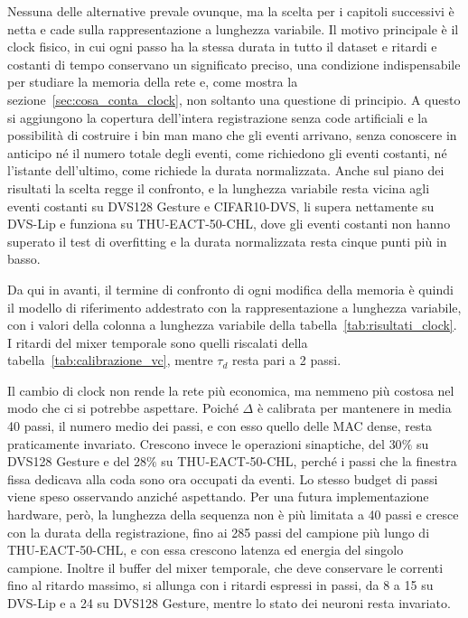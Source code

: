 Nessuna delle alternative prevale ovunque, ma la scelta per i capitoli successivi è netta e cade sulla rappresentazione a lunghezza variabile. Il motivo principale è il clock fisico, in cui ogni passo ha la stessa durata in tutto il dataset e ritardi e costanti di tempo conservano un significato preciso, una condizione indispensabile per studiare la memoria della rete e, come mostra la sezione~\ref{sec:cosa_conta_clock}, non soltanto una questione di principio. A questo si aggiungono la copertura dell'intera registrazione senza code artificiali e la possibilità di costruire i bin man mano che gli eventi arrivano, senza conoscere in anticipo né il numero totale degli eventi, come richiedono gli eventi costanti, né l'istante dell'ultimo, come richiede la durata normalizzata. Anche sul piano dei risultati la scelta regge il confronto, e la lunghezza variabile resta vicina agli eventi costanti su DVS128 Gesture e CIFAR10-DVS, li supera nettamente su DVS-Lip e funziona su THU-EACT-50-CHL, dove gli eventi costanti non hanno superato il test di overfitting e la durata normalizzata resta cinque punti più in basso.

Da qui in avanti, il termine di confronto di ogni modifica della memoria è quindi il modello di riferimento addestrato con la rappresentazione a lunghezza variabile, con i valori della colonna a lunghezza variabile della tabella~\ref{tab:risultati_clock}. I ritardi del mixer temporale sono quelli riscalati della tabella~\ref{tab:calibrazione_vc}, mentre $\tau_d$ resta pari a 2 passi.

Il cambio di clock non rende la rete più economica, ma nemmeno più costosa nel modo che ci si potrebbe aspettare. Poiché $\Delta$ è calibrata per mantenere in media 40 passi, il numero medio dei passi, e con esso quello delle MAC dense, resta praticamente invariato. Crescono invece le operazioni sinaptiche, del $30\%$ su DVS128 Gesture e del $28\%$ su THU-EACT-50-CHL, perché i passi che la finestra fissa dedicava alla coda sono ora occupati da eventi. Lo stesso budget di passi viene speso osservando anziché aspettando. Per una futura implementazione hardware, però, la lunghezza della sequenza non è più limitata a 40 passi e cresce con la durata della registrazione, fino ai 285 passi del campione più lungo di THU-EACT-50-CHL, e con essa crescono latenza ed energia del singolo campione. Inoltre il buffer del mixer temporale, che deve conservare le correnti fino al ritardo massimo, si allunga con i ritardi espressi in passi, da 8 a 15 su DVS-Lip e a 24 su DVS128 Gesture, mentre lo stato dei neuroni resta invariato.

